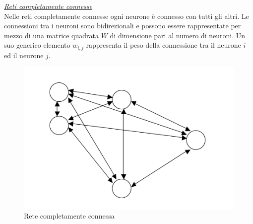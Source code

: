 \documentclass[12pt,a4paper,oneside]{book}
\begin{document}
		\underline{\emph{Reti completamente connesse}}\\
		Nelle reti completamente connesse ogni neurone è connesso con tutti gli altri. Le connessioni tra i neuroni sono bidirezionali e possono essere rappresentate per mezzo di una matrice quadrata $W$ di dimensione pari al numero di neuroni. Un suo generico elemento $w_{i,j}$ rappresenta il peso della connessione tra il neurone $i$ ed il neurone $j$.  
		
		\clearpage
		\begin{figure}[h!]
			\centering
			\includegraphics[width=0.6\linewidth]{IMMAGINI/completamenteconnesssa}
			\caption{ Rete completamente connessa}
			\label{fig:completamenteconnesssa}
		\end{figure}
		
\end{document}
